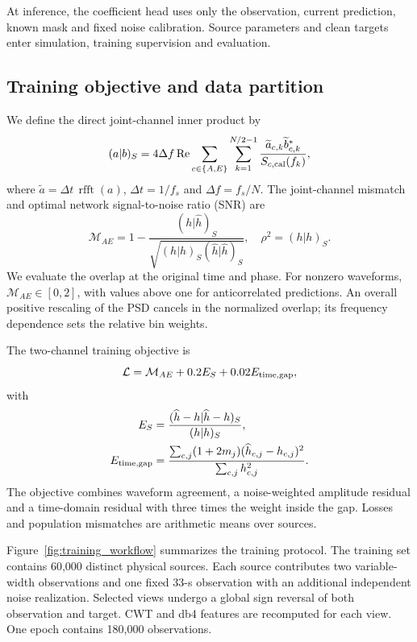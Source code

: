 \documentclass[10pt,prd,aps,a4paper,twocolumn,superscriptaddress,nofootinbib,floatfix]{revtex4-2}
\begin{document}
At inference, the coefficient head uses only the observation, current prediction, known mask and fixed noise calibration. Source parameters and clean targets enter simulation, training supervision and evaluation.

\subsection{Training objective and data partition}\label{loss}
We define the direct joint-channel inner product by
\begin{equation}
(a|b)_S=4\Delta f\operatorname{Re}
\sum_{c\in\{A,E\}}\sum_{k=1}^{N/2-1}
\frac{\widetilde a_{c,k}\widetilde b_{c,k}^{*}}{S_{c,\rm cal}(f_k)},\label{eq:joint_inner}
\end{equation}
where $\widetilde a=\Delta t\,\operatorname{rfft}(a)$, $\Delta t=1/f_s$ and $\Delta f=f_s/N$. The joint-channel mismatch and optimal network signal-to-noise ratio (SNR) are
\begin{equation}
\mathcal M_{AE}=1-\frac{(h|\widehat h)_S}{\sqrt{(h|h)_S(\widehat h|\widehat h)_S}},\quad
\rho^2=(h|h)_S.\label{eq:joint_mismatch}
\end{equation}
We evaluate the overlap at the original time and phase. For nonzero waveforms, $\mathcal M_{AE}\in[0,2]$, with values above one for anticorrelated predictions. An overall positive rescaling of the PSD cancels in the normalized overlap; its frequency dependence sets the relative bin weights.

The two-channel training objective is
\begin{equation}
\mathcal L=\mathcal M_{AE}+0.2E_S+0.02E_{\rm time,gap},\label{eq:loss}
\end{equation}
with
\begin{align}
E_S&=\frac{(\widehat h-h|\widehat h-h)_S}{(h|h)_S},\nonumber\\
E_{\rm time,gap}&=\frac{\sum_{c,j}(1+2m_j)(\widehat h_{c,j}-h_{c,j})^2}{\sum_{c,j}h_{c,j}^2}.\label{eq:auxiliary_errors}
\end{align}
The objective combines waveform agreement, a noise-weighted amplitude residual and a time-domain residual with three times the weight inside the gap. Losses and population mismatches are arithmetic means over sources.

Figure~\ref{fig:training_workflow} summarizes the training protocol. The training set contains 60,000 distinct physical sources. Each source contributes two variable-width observations and one fixed 33-s observation with an additional independent noise realization. Selected views undergo a global sign reversal of both observation and target. CWT and db4 features are recomputed for each view. One epoch contains 180,000 observations.
\end{document}
